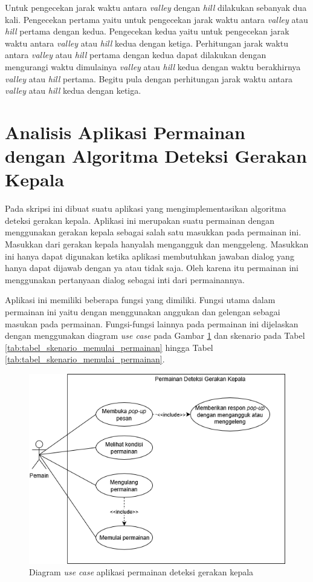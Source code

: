 Untuk pengecekan jarak waktu antara \textit{valley} dengan \textit{hill} dilakukan sebanyak dua kali. Pengecekan pertama yaitu untuk pengecekan jarak waktu antara \textit{valley} atau \textit{hill} pertama dengan kedua. Pengecekan kedua yaitu untuk pengecekan jarak waktu antara \textit{valley} atau \textit{hill} kedua dengan ketiga. Perhitungan jarak waktu antara \textit{valley} atau \textit{hill} pertama dengan kedua dapat dilakukan dengan mengurangi waktu dimulainya \textit{valley} atau \textit{hill} kedua dengan waktu berakhirnya \textit{valley} atau \textit{hill} pertama. Begitu pula dengan perhitungan jarak waktu antara \textit{valley} atau \textit{hill} kedua dengan ketiga.



\section{Analisis Aplikasi Permainan dengan Algoritma Deteksi Gerakan Kepala}
\label{sec:analisis_aplikasi_permainan_dengan_algoritma_deteksi_gerakan_kepala}

Pada skripsi ini dibuat suatu aplikasi yang mengimplementasikan algoritma deteksi gerakan kepala. Aplikasi ini merupakan suatu permainan dengan menggunakan gerakan kepala sebagai salah satu masukkan pada permainan ini. Masukkan dari gerakan kepala hanyalah mengangguk dan menggeleng. Masukkan ini hanya dapat digunakan ketika aplikasi membutuhkan jawaban dialog yang hanya dapat dijawab dengan ya atau tidak saja. Oleh karena itu permainan ini menggunakan pertanyaan dialog sebagai inti dari permainannya.

Aplikasi ini memiliki beberapa fungsi yang dimiliki. Fungsi utama dalam permainan ini yaitu dengan menggunakan anggukan dan gelengan sebagai masukan pada permainan. Fungsi-fungsi lainnya pada permainan ini dijelaskan dengan menggunakan diagram \textit{use case} pada Gambar \ref{fig:use_case_diagram} dan skenario pada Tabel \ref{tab:tabel_skenario_memulai_permainan} hingga Tabel \ref{tab:tabel_skenario_memulai_permainan}.


\begin{figure}[htbp]
\centering
\includegraphics[scale=0.6]{Gambar/usecasediagram.png}
\caption{Diagram \textit{use case} aplikasi permainan deteksi gerakan kepala}
\label{fig:use_case_diagram}
\end{figure}


